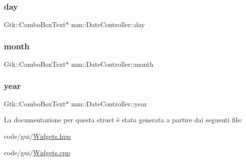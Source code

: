 \subsubsection{\texorpdfstring{day}{day}}
{\footnotesize\ttfamily Gtk\+::\+Combo\+Box\+Text$\ast$ mm\+::\+Date\+Controller\+::day}

\mbox{\label{structmm_1_1_date_controller_a1e7373cef0b00e63343ef9d30a1e80c5}} 
\subsubsection{\texorpdfstring{month}{month}}
{\footnotesize\ttfamily Gtk\+::\+Combo\+Box\+Text$\ast$ mm\+::\+Date\+Controller\+::month}

\mbox{\label{structmm_1_1_date_controller_a36179406cda47b8c18d1a84945a5e61c}} 
\subsubsection{\texorpdfstring{year}{year}}
{\footnotesize\ttfamily Gtk\+::\+Combo\+Box\+Text$\ast$ mm\+::\+Date\+Controller\+::year}



La documentazione per questa struct è stata generata a partire dai seguenti file\+:\begin{DoxyCompactItemize}
\item 
code/gui/\hyperlink{_widgets_8hpp}{Widgets.\+hpp}\item 
code/gui/\hyperlink{_widgets_8cpp}{Widgets.\+cpp}\end{DoxyCompactItemize}
